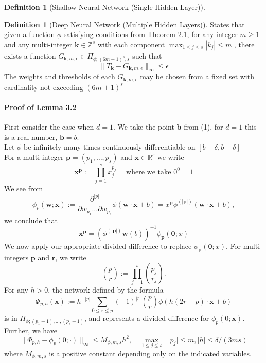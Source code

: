 \documentclass[11pt,a4paper]{article}
\theoremstyle{plain}
\theoremstyle{definition}
\newtheorem{definition}[theorem]{Definition}
\theoremstyle{remark}
\begin{document}
\begin{definition}[Shallow Neural Network (Single Hidden Layer)]
\begin{definition}[Deep Neural Network (Multiple Hidden Layers)]
States that given a function \(\phi\) satisfying conditions from Theorem 2.1, for any integer \(m \geq 1\) and any multi-integer \(\mathbf{k} \in \mathbb{Z}^{s} \) with each component \(\mathop{\max}_{1 \leq j \leq s} |k_{j}| \leq m\) , there exists a function \(G_{\mathbf{k} ,m ,\epsilon} \in \Pi_{\phi ; (6m +1)^s, s}\) such that 
\[
    \|T_{\mathbf{k}} - G_{\mathbf{k} ,m ,\epsilon}\|_{\infty} \leq \epsilon
\]
The weights and thresholds of each \(G_{\mathbf{k} ,m,\epsilon }\) may be chosen from a fixed set with cardinality not exceeding \((6m  +1)^s\) 

\paragraph[short]{Proof of Lemma 3.2}

First consider the case when \(d = 1\). We take the point \(\mathbf{b} \) from (1), for \(d = 1\) this is a real number, \(\mathbf{b} = b \).\\
Let \(\phi \) be infinitely many times continuously differentiable on \([b-\delta ,b+\delta ]\) \\

For a multi-integer \(\mathbf{p} = (p_1, \ldots , p_{s} )\) and \(\mathbf{x} \in \mathbb{R}^s\) we write 
\[
    \mathbf{x}^{\mathbf{p} } := \prod_{j=1}^{s} x_{j}^{p_{j}} \quad \text{ where we take } 0^0 = 1
\]
We see from
\[
    \phi_{p}(\mathbf{w}; \mathbf{x}) := \frac{\partial^{|p|}}{\partial w_{p_1} \dots \partial w_{p_s}} \phi(\mathbf{w} \cdot \mathbf{x} + b) = x^{\mathbf{p} } \phi^{(|\mathbf{p}|)}(\mathbf{w} \cdot \mathbf{x} + b),
\]
we conclude that
\[
    \mathbf{x}^{\mathbf{p} } = \left(
        \phi^{(|\mathbf{p}|)}\mathbf{w} (b)
     \right)^{-1} \phi_{\mathbf{p} }(\textbf{0} ; x)
\]
We now apply our appropriate divided difference to replace \(\phi_{\mathbf{p} }(\textbf{0} ; x)\).
For multi-integers \(\mathbf{p}\) and \(\mathbf{r} \), we write
\[
\binom{p}{r} := \prod_{j=1}^{s} \binom{p_j}{r_j}.
\]
For any \( h > 0 \), the network defined by the formula
\[    
    \Phi_{p,h}(\mathbf{x}) := h^{-|p|} \sum_{0 \leq r \leq p} (-1)^{|r|} \binom{p}{r} \phi(h(2r - p) \cdot \mathbf{x} + b)
\]
is in \( \Pi_{\phi;(p_1+1), \ldots, (p_s+1)} \), and represents a divided difference for \( \phi_{p}(0; \mathbf{x}) \). Further, we have
\[
\| \Phi_{p,h} - \phi_{p}(0; \cdot) \|_{\infty} \leq M_{\phi,m,s}h^2, \quad \mathop{\max}_{1 \leq j \leq s} \mid p_{j} \mid \leq m, \mid h \mid \leq \delta / (3ms)
\]
where \( M_{\phi,m,s} \) is a positive constant depending only on the indicated variables.


\end{definition}
\end{definition}
\end{document}
